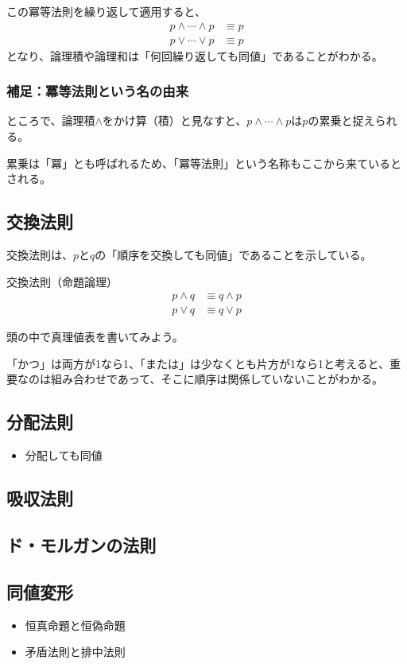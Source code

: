 \documentclass[../../imaging-math]{subfiles}
\begin{document}
\br

この冪等法則を繰り返して適用すると、
\begin{align*}
  p \land \cdots \land p & \equiv p \\
  p \lor \cdots \lor p   & \equiv p
\end{align*}
となり、論理積や論理和は「何回繰り返しても同値」であることがわかる。

\subsubsection{補足：冪等法則という名の由来}

ところで、論理積$\land$をかけ算（積）と見なすと、$  p \land \cdots \land p$は$p$の累乗と捉えられる。

累乗は「冪」とも呼ばれるため、「冪等法則」という名称もここから来ているとされる。

\subsection{交換法則}

交換法則は、$p$と$q$の「順序を交換しても同値」であることを示している。

\begin{theorem}{交換法則（命題論理）}
  \large
  \begin{align*}
    p \land q & \equiv q \land p \\
    p \lor q  & \equiv q \lor p
  \end{align*}
\end{theorem}

頭の中で真理値表を書いてみよう。

「かつ」は両方が1なら1、「または」は少なくとも片方が1なら1と考えると、重要なのは組み合わせであって、そこに順序は関係していないことがわかる。

\subsection{分配法則}

\begin{mindflow}
  \begin{itemize}
    \item 分配しても同値
  \end{itemize}
\end{mindflow}

\subsection{吸収法則}

\subsection{ド・モルガンの法則}

\subsection{同値変形}

\begin{mindflow}
  \begin{itemize}
    \item 恒真命題と恒偽命題
    \item 矛盾法則と排中法則
  \end{itemize}
\end{mindflow}
\end{document}
